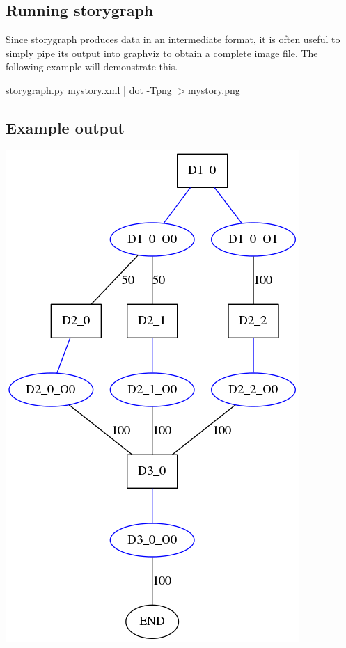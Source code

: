 \documentclass[12pt,letterpaper]{article}
\begin{document}
 \subsection{Running storygraph}
 Since storygraph produces data in an intermediate format, it is often useful to simply pipe its output into graphviz
 to obtain a complete image file. The following example will demonstrate this.
 
 \begin{center}
 storygraph.py mystory.xml | dot -Tpng $>$mystory.png
 \end{center}
 
 \subsection{Example output}
 \begin{center}
 \includegraphics[scale=0.4]{storygraph.png}
 \end{center}
 
\end{document}
